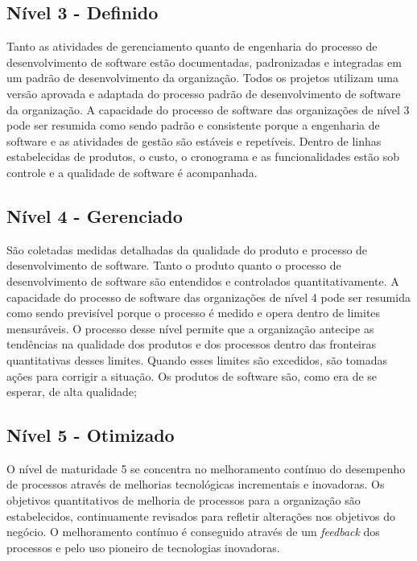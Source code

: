 \subsection{Nível 3 - Definido}

Tanto as atividades de gerenciamento quanto de engenharia do
processo de desenvolvimento de software estão documentadas, padronizadas e integradas
em um padrão de desenvolvimento da organização. Todos os projetos utilizam uma versão
aprovada e adaptada do processo padrão de desenvolvimento de software da organização.
A capacidade do processo de software das organizações de nível 3 pode ser resumida como
sendo padrão e consistente porque a engenharia de software e as atividades de gestão são
estáveis e repetíveis. Dentro de linhas estabelecidas de produtos, o custo, o cronograma e as funcionalidades estão sob controle e a qualidade de software é acompanhada.

\subsection{Nível 4 - Gerenciado}

São coletadas medidas detalhadas da qualidade do produto e
processo de desenvolvimento de software. Tanto o produto quanto o processo de
desenvolvimento de software são entendidos e controlados quantitativamente. A capacidade
do processo de software das organizações de nível 4 pode ser resumida como sendo
previsível porque o processo é medido e opera dentro de limites mensuráveis. O processo
desse nível permite que a organização antecipe as tendências na qualidade dos produtos e
dos processos dentro das fronteiras quantitativas desses limites. Quando esses limites são
excedidos, são tomadas ações para corrigir a situação. Os produtos de software são, como
era de se esperar, de alta qualidade;

\subsection{Nível 5 - Otimizado}

O nível de maturidade 5 se concentra no melhoramento contínuo do
desempenho de processos através de melhorias tecnológicas incrementais e inovadoras. Os
objetivos quantitativos de melhoria de processos para a organização são estabelecidos,
continuamente revisados para refletir alterações nos objetivos do negócio. O melhoramento
contínuo é conseguido através de um \textit{feedback} dos processos e pelo uso pioneiro de
tecnologias inovadoras.

